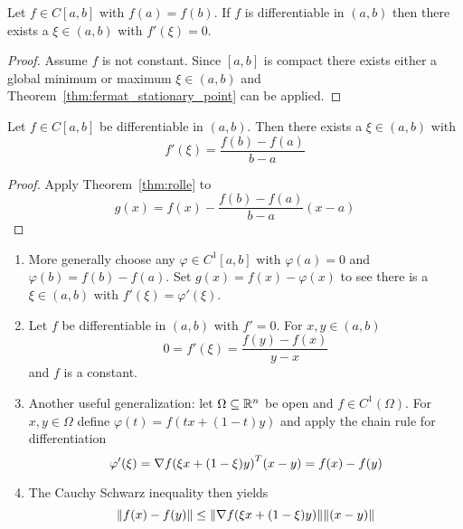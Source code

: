 \begin{theorem}[Rolle]\label{thm:rolle}
    Let \( f \in C[a,b] \) with \( f(a) = f(b) \). If \( f \) is differentiable in \( (a, b) \) then
    there exists a \( \xi \in (a,b) \) with \( f'(\xi) = 0 \).
\end{theorem}

\begin{proof}
    Assume \( f \) is not constant. Since \( [a,b] \) is compact there exists either a global minimum or maximum
    \( \xi \in (a,b) \) and Theorem~\ref{thm:fermat_stationary_point} can be applied.
\end{proof}
\bigskip


\begin{theorem}\label{thm:mean_value}
    Let \( f \in C[a,b] \) be differentiable in \( (a, b) \). Then there exists a \( \xi \in (a,b) \) with
    \[
        f'(\xi) = \frac{f(b) - f(a)}{b - a}
    \]
\end{theorem}

\begin{proof}
    Apply Theorem~\ref{thm:rolle} to
    \[
        g(x) = f(x) - \frac{f(b) - f(a)}{b - a} (x -a)
    \]
\end{proof}
\bigskip


\begin{remark}\hfill
    \begin{enumerate}
        \item More generally choose any \( \varphi \in C^1[a,b] \) with \( \varphi(a) = 0 \) and
              \( \varphi(b) = f(b) - f(a) \). Set \( g(x) = f(x) - \varphi(x) \) to see there is a \( \xi \in (a,b) \)
              with \( f'(\xi) = \varphi'(\xi)\).
        \item Let \( f \) be differentiable in \( (a, b) \) with \( f' = 0 \). For \( x, y \in (a, b) \)
              \[
                  0 = f'(\xi) = \frac{f(y) - f(x)}{y - x}
              \]
              and \( f \) is a constant.
        \item Another useful generalization: let \( \Omega \subseteq \mathbb{R}^n \) be open and \( f \in C^1(\Omega) \). For
              \( x, y \in \Omega \) define \( \varphi(t) = f(tx + (1 - t)y) \) and apply the chain rule for differentiation
              \[
                  \varphi'(\xi) = \nabla {f(\xi x + (1 - \xi)y)}^T(x - y) = f(x) - f(y)
              \]
        \item The Cauchy Schwarz inequality then yields
              \[
                  \|f(x) - f(y)\| \le \|\nabla f(\xi x + (1 - \xi)y)\| \|(x - y)\|
              \]
    \end{enumerate}
\end{remark}
\bigskip


